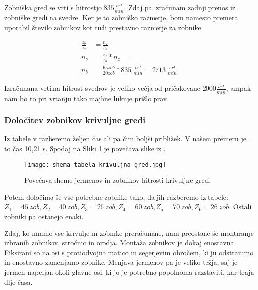 Zobniška gred se vrti s hitrostjo \(835 \frac{vrt}{min}\). Zdaj pa izračunam
zadnji prenos iz zobniške gredi na svedre. Ker je to zobniško razmerje, bom namesto
premera uporabil število zobnikov kot tudi prestavno razmerje za zobnike.

\begin{equation}
	\label{eq:12}
	\begin{split}
		\frac{z_b}{z_z} &= \frac{n_z}{b_b} \\
		n_b &= \frac{z_z}{z_b} * n_z = \\
		n_b &= \frac{65 zob}{20 zob} * 835\ \frac{vrt}{min} = 2713\ \frac{vrt}{min}
	\end{split}
\end{equation}

Izračunana vrtilna hitrost svedrov je veliko večja od pričakovane \(2000\frac{vrt}{min}\),
ampak nam bo to pri vrtanju tako majhne luknje prišlo prav.

\subsubsection{Določitev zobnikov krivuljne gredi}

Iz tabele v  razberemo željen čas
ali pa čim boljši približek. V našem premeru je to čas 10,21 s.
Spodaj na Sliki \ref{povecava} je povečava slike iz .
\begin{figure}[H]
	\begin{center}
		\texttt{[image: shema\_tabela\_krivuljna\_gred.jpg]}
		\caption{Povečava sheme jermenov in zobnikov
			hitrosti krivuljne gredi
			\cite{gauthier}}
		\label{povecava}
	\end{center}
\end{figure}

Potem določimo še vse potrebne zobnike tako, da jih razberemo iz tabele: \\
\(Z_1 = 45\ zob, Z_2 = 40\ zob, Z_3 = 25\ zob, Z_4 = 60\ zob, Z_5 = 70\ zob, Z_6 = 26\ zob\).
Ostali zobniki pa ostanejo enaki.

Zdaj, ko imamo vse krivulje in zobnike preračunane, nam preostane še montiranje izbranih
zobnikov, stročnic in orodja. Montaža zobnikov je dokaj enostavna.
Fiksirani so na osi s protiodvojno matico in segerjevim obročem,
ki ju odstranimo in enostavno zamenjamo zobnike. Menjava jermenov pa je veliko težja, saj je jermen napeljan okoli glavne osi,
ki jo je potrebno popolnoma razstaviti, kar traja dlje časa.